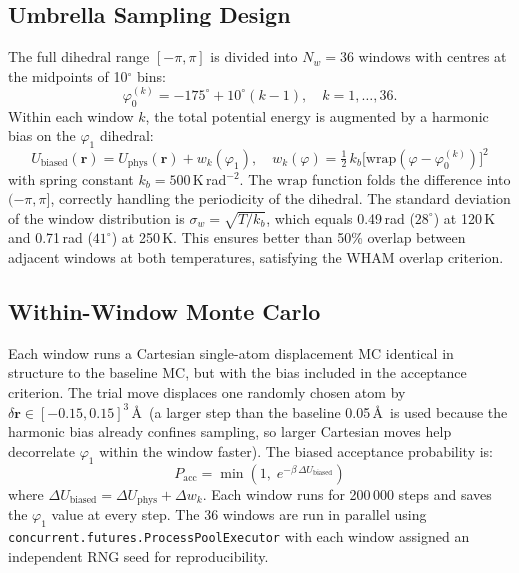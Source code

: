\documentclass[12pt,a4paper]{article}
\begin{document}
\subsection{Umbrella Sampling Design}
The full dihedral range $[-\pi, \pi]$ is divided into $N_w = 36$ windows
with centres at the midpoints of 10$^{\circ}$ bins:
\[
  \varphi_0^{(k)} = -175^{\circ} + 10^{\circ}(k-1), \quad k = 1,\ldots, 36.
\]
Within each window $k$, the total potential energy is augmented by a
harmonic bias on the $\varphi_1$ dihedral:
\begin{equation}
  U_{\mathrm{biased}}(\mathbf{r}) = U_{\mathrm{phys}}(\mathbf{r})
    + w_k(\varphi_1),
  \quad
  w_k(\varphi) = \tfrac{1}{2}\,k_b\bigl[\mathrm{wrap}(\varphi - \varphi_0^{(k)})\bigr]^2
  \label{eq:bias}
\end{equation}
with spring constant $k_b = 500$\,K\,rad$^{-2}$.  The $\mathrm{wrap}$
function folds the difference into $(-\pi, \pi]$, correctly handling the
periodicity of the dihedral.  The standard deviation of the window
distribution is $\sigma_w = \sqrt{T/k_b}$, which equals 0.49\,rad
($28^{\circ}$) at 120\,K and 0.71\,rad ($41^{\circ}$) at 250\,K.
This ensures better than 50\% overlap between adjacent windows at both
temperatures, satisfying the WHAM overlap criterion.

\subsection{Within-Window Monte Carlo}
Each window runs a Cartesian single-atom displacement MC identical in
structure to the baseline MC, but with the bias included in the acceptance
criterion.  The trial move displaces one randomly chosen atom by
$\delta\mathbf{r} \in [-0.15, 0.15]^3$\,\AA\ (a larger step than the
baseline 0.05\,\AA\ is used because the harmonic bias already confines
sampling, so larger Cartesian moves help decorrelate $\varphi_1$
within the window faster).  The biased acceptance probability is:
\begin{equation}
  P_{\mathrm{acc}} = \min\!\left(1,\; e^{-\beta\,\Delta U_{\mathrm{biased}}}\right)
  \label{eq:bias_accept}
\end{equation}
where $\Delta U_{\mathrm{biased}} = \Delta U_{\mathrm{phys}} + \Delta w_k$.
Each window runs for 200\,000 steps and saves the $\varphi_1$ value at
every step.  The 36 windows are run in parallel using
\texttt{concurrent.futures.ProcessPoolExecutor} with each window assigned
an independent RNG seed for reproducibility.
\end{document}
